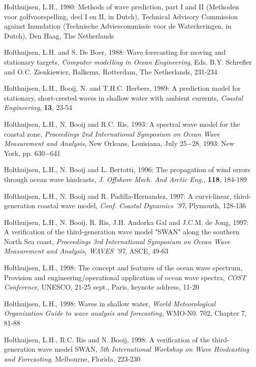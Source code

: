 \documentclass[12pt]{book}
\begin{document}
\begin{thebibliography}{10}
Holthuijsen, L.H., 1980: Methods of wave prediction, part I and II (Methoden voor golfvoorspelling, deel I
en II, in Dutch), Technical Advisory Commission against Inundation (Technische
Adviescommissie voor de Waterkeringen, in Dutch), Den Haag, The Netherlands

Holthuijsen, L.H. and S. De Boer, 1988: Wave forecasting for moving and stationary targets, {\it Computer
modelling in Ocean Engineering}, Eds. B.Y. Schrefler and O.C. Zienkiewicz, Balkema, Rotterdam,
The Netherlands, 231-234

Holthuijsen, L.H., Booij, N. and T.H.C. Herbers, 1989: A prediction model for stationary, short-crested
waves in shallow water with ambient currents, {\it Coastal Engineering}, {\bf 13}, 23-54

Holthuijsen, L.H., N. Booij and R.C. Ris, 1993: A spectral wave model for the coastal zone, {\it Proceedings
2nd International Symposium on Ocean Wave Measurement and Analysis}, New Orleans,
Louisiana, July 25$-$28, 1993: New York, pp. 630$-$641

Holthuijsen, L.H., N. Booij and L. Bertotti, 1996: The propagation of wind errors through
ocean wave hindcasts, {\it J. Offshore Mech. And Arctic Eng.}, {\bf 118}, 184-189

Holthuijsen, L.H., N. Booij and R. Padilla-Hernandez, 1997: A curvi-linear, third-generation coastal wave
model, {\it Conf. Coastal Dynamics '97}, Plymouth, 128-136

Holthuijsen, L.H., N. Booij, R. Ris, J.H. Andorka Gal and J.C.M. de Jong, 1997: A verification of the third-generation
wave model "SWAN" along the southern North Sea coast,  {\it Proceedings 3rd
International Symposium on Ocean Wave Measurement and Analysis, WAVES '97}, ASCE, 49-63

Holthuijsen, L.H., 1998: The concept and features of the ocean wave spectrum,
Provision and engineering/operational application of ocean wave spectra,
{\it COST Conference}, UNESCO, 21-25 sept., Paris, keynote address, 11-20

Holthuijsen, L.H., 1998: Waves in shallow water,
{\it World Meteorological Organization Guide to wave analysis and forecasting},
WMO-N0. 702, Chapter 7, 81-88

Holthuijsen, L.H., R.C. Ris and N. Booij, 1998: A verification of the third-generation wave model SWAN,
{\it 5th International Workshop on Wave Hindcasting and Forecasting}, Melbourne, Florida, 223-230


\end{thebibliography}
\end{document}
